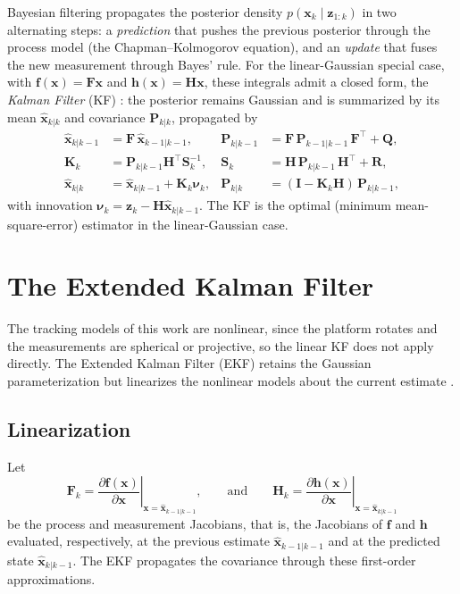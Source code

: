 Bayesian filtering propagates the posterior density $p(\bm{x}_k\mid \bm{z}_{1:k})$
in two alternating steps: a \emph{prediction} that pushes the previous posterior
through the process model (the Chapman--Kolmogorov equation), and an
\emph{update} that fuses the new measurement through Bayes' rule. For the
linear-Gaussian special case, with $\bm{f}(\bm{x})=\bm{F}\bm{x}$ and
$\bm{h}(\bm{x})=\bm{H}\bm{x}$, these integrals admit a closed form, the
\emph{Kalman Filter} (KF) \cite{barshalom2001,brookner1998}: the posterior
remains Gaussian and is summarized by its mean $\hat{\bm{x}}_{k|k}$ and covariance
$\bm{P}_{k|k}$, propagated by
\begin{align}
  \hat{\bm{x}}_{k|k-1} &= \bm{F}\,\hat{\bm{x}}_{k-1|k-1}, &
  \bm{P}_{k|k-1} &= \bm{F}\,\bm{P}_{k-1|k-1}\,\bm{F}^{\top} + \bm{Q}, \label{eq:kf_predict}\\
  \bm{K}_k &= \bm{P}_{k|k-1}\bm{H}^{\top}\bm{S}_k^{-1}, &
  \bm{S}_k &= \bm{H}\,\bm{P}_{k|k-1}\,\bm{H}^{\top} + \bm{R}, \label{eq:kf_gain}\\
  \hat{\bm{x}}_{k|k} &= \hat{\bm{x}}_{k|k-1} + \bm{K}_k\bm{\nu}_k, &
  \bm{P}_{k|k} &= (\bm{I}-\bm{K}_k\bm{H})\,\bm{P}_{k|k-1}, \label{eq:kf_update}
\end{align}
with innovation $\bm{\nu}_k=\bm{z}_k-\bm{H}\hat{\bm{x}}_{k|k-1}$. The KF is the
optimal (minimum mean-square-error) estimator in the linear-Gaussian case.

\section{The Extended Kalman Filter}

The tracking models of this work are nonlinear, since the platform rotates and the
measurements are spherical or projective, so the linear KF does not apply
directly. The Extended Kalman Filter (EKF) retains the Gaussian parameterization
but linearizes the nonlinear models about the current estimate
\cite{terejanu2008,barshalom2001}.

\subsection{Linearization}

Let
\begin{equation}
  \bm{F}_k = \left.\frac{\partial \bm{f}(\bm{x})}{\partial \bm{x}}\right|_{\bm{x}=\hat{\bm{x}}_{k-1|k-1}},
  \qquad \mbox{and} \qquad
  \bm{H}_k = \left.\frac{\partial \bm{h}(\bm{x})}{\partial \bm{x}}\right|_{\bm{x}=\hat{\bm{x}}_{k|k-1}}
  \label{eq:ekf_jac}
\end{equation}
be the process and measurement Jacobians, that is, the Jacobians of $\bm{f}$ and
$\bm{h}$ evaluated, respectively, at the previous estimate
$\hat{\bm{x}}_{k-1|k-1}$ and at the predicted state $\hat{\bm{x}}_{k|k-1}$. The EKF
propagates the covariance through these first-order approximations.

